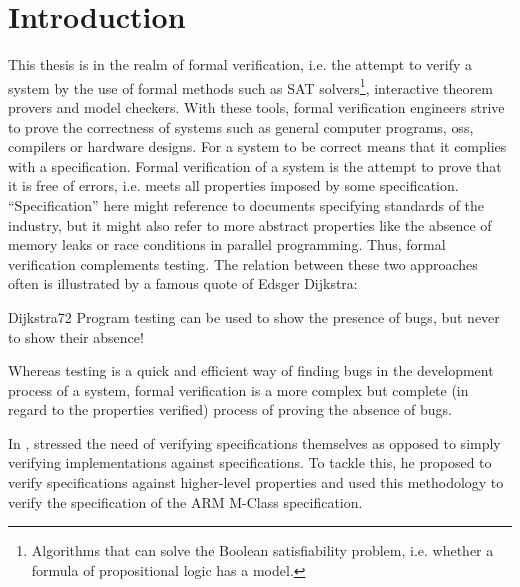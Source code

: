 
\chapter{Introduction}
\label{chp:introduction}

This thesis is in the realm of formal verification, i.e. the attempt to verify a system by the use of formal methods such as SAT solvers\footnote{%
    Algorithms that can solve the Boolean satisfiability problem, i.e. whether a formula of propositional logic has a model.
}, interactive theorem provers and model checkers.
With these tools, formal verification engineers strive to prove the correctness of systems such as general computer programs, \glspl{os}, compilers or hardware designs.
For a system to be correct means that it complies with a specification.
Formal verification of a system is the attempt to prove that it is free of errors, i.e. meets all properties imposed by some specification.
\enquote{Specification} here might reference to documents specifying standards of the industry, but it might also refer to more abstract properties like the absence of memory leaks or race conditions in parallel programming.
Thus, formal verification complements testing.
The relation between these two approaches often is illustrated by a famous quote of Edsger Dijkstra:
\begin{displaycquote}[p.6]{Dijkstra72}
    Program testing can be used to show the presence of bugs, but never to show their absence!
\end{displaycquote}

Whereas testing is a quick and efficient way of finding bugs in the development process of a system, formal verification is a more complex but complete (in regard to the properties verified) process of proving the absence of bugs.

In  \cite{Reid17}, \citeauthor{Reid17} stressed the need of verifying specifications themselves as opposed to simply verifying implementations against specifications.
To tackle this, he proposed to verify specifications against higher-level properties and used this methodology to verify the specification of the ARM M-Class specification.

